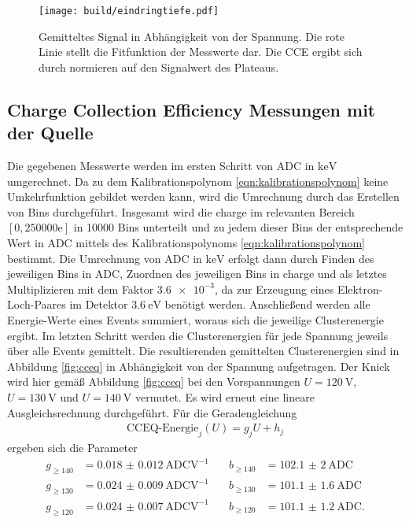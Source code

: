 \begin{figure}
  \centering
  \texttt{[image: build/eindringtiefe.pdf]}
  \caption{Gemitteltes Signal in Abhängigkeit von der Spannung. Die rote Linie stellt die Fitfunktion der Messwerte dar. Die CCE ergibt sich durch normieren auf den Signalwert des Plateaus.}
  \label{fig:eindringtiefe}
\end{figure}

\subsection{Charge Collection Efficiency Messungen mit der Quelle}
\label{sec:cceq}

Die gegebenen Messwerte werden im ersten Schritt von ADC in $\si{\kilo\electronvolt}$ umgerechnet.
Da zu dem Kalibrationspolynom \eqref{eqn:kalibrationspolynom} keine Umkehrfunktion gebildet werden kann,
wird die Umrechnung durch das Erstellen von Bins durchgeführt. Insgesamt wird die charge im relevanten Bereich
$[0,250000\mathrm{e}]$ in 10000 Bins unterteilt und zu jedem dieser Bins der entsprechende Wert in ADC mittels
des Kalibrationspolynoms \eqref{eqn:kalibrationspolynom} bestimmt. Die Umrechnung von ADC in $\si{\kilo\electronvolt}$
erfolgt dann durch Finden des jeweiligen Bins in ADC, Zuordnen des jeweiligen Bins in charge und als letztes Multiplizieren
mit dem Faktor $\num{3.6e-3}$, da zur Erzeugung eines Elektron-Loch-Paares im Detektor $\SI{3.6}{\electronvolt}$
benötigt werden. Anschließend werden alle Energie-Werte eines Events summiert, woraus sich die jeweilige Clusterenergie ergibt.
Im letzten Schritt werden die Clusterenergien für jede Spannung jeweils über alle Events gemittelt. Die resultierenden
gemittelten Clusterenergien sind in Abbildung \ref{fig:cceq} in Abhängigkeit von der Spannung aufgetragen.
Der Knick wird hier gemäß Abbildung \ref{fig:cceq} bei den Vorspannungen $U = \SI{120}{\volt}$, $U = \SI{130}{\volt}$ und
$U = \SI{140}{\volt}$ vermutet. Es wird erneut eine lineare Ausgleichsrechnung durchgeführt.
Für die Geradengleichung
\begin{align}
  \text{CCEQ-Energie}_j(U) = g_j U + h_j
\end{align}
ergeben sich die Parameter
\begin{align*}
  g_{\geq140} &= \SI{0.018(12)}{\text{ADC}\volt\tothe{-1}} &\quad b_{\geq140} &= \SI{102.1(20)}{\text{ADC}} \\
  g_{\geq130} &=  \SI{0.024(9)}{\text{ADC}\volt\tothe{-1}} &\quad b_{\geq130} &= \SI{101.1(16)}{\text{ADC}} \\
  g_{\geq120} &=  \SI{0.024(7)}{\text{ADC}\volt\tothe{-1}} &\quad b_{\geq120} &= \SI{101.1(12)}{\text{ADC}}.
\end{align*}
